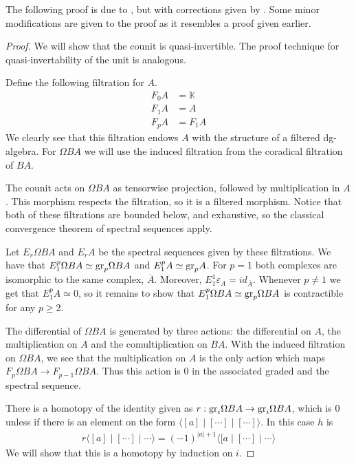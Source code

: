 \documentclass[../thesis.tex]{subfiles}
\begin{document}
            The following proof is due to \cite{LefevreHasegawa03}, but with corrections given by \cite{Keller05}. Some minor modifications are given to the proof as it resembles a proof given earlier.

            \begin{proof}
                We will show that the counit is quasi-invertible. The proof technique for quasi-invertability of the unit is analogous.

                Define the following filtration for $A$.
                \begin{align*}
                    F_0A & = \mathbb{K} \\
                    F_1A & = A \\
                    F_pA & = F_1A 
                \end{align*}
                We clearly see that this filtration endows $A$ with the structure of a filtered dg-algebra. For $\Omega BA$ we will use the induced filtration from the coradical filtration of $BA$.

                The counit acts on $\Omega BA$ as tensorwise projection, followed by multiplication in $A$. This morphism respects the filtration, so it is a filtered morphism. Notice that both of these filtrations are bounded below, and exhaustive, so the classical convergence theorem of spectral sequences apply.

                Let $E_r\Omega BA$ and $E_rA$ be the spectral sequences given by these filtrations. We have that $E_1^{p}\Omega BA \simeq \tt{gr}_p \Omega BA$ and $E_1^{p}A \simeq \tt{gr}_pA$. For $p=1$ both complexes are isomorphic to the same complex, $\overline{A}$. Moreover, $E_1^{1}\varepsilon_A = id_{\overline{A}}$. Whenever $p\neq 1$ we get that $E_1^p A \simeq 0$, so it remains to show that $E_1^p \Omega BA \simeq \tt{gr}_p \Omega BA$ is contractible for any $p \geq 2$.

                The differential of $\Omega BA$ is generated by three actions: the differential on $A$, the multiplication on $A$ and the comultiplication on $BA$. With the induced filtration on $\Omega BA$, we see that the multiplication on $A$ is the only action which maps $F_p\Omega BA \rightarrow F_{p-1}\Omega BA$. Thus this action is $0$ in the associated graded and the spectral sequence. 

                There is a homotopy of the identity given as $r : \tt{gr}_i \Omega BA \rightarrow \tt{gr}_i \Omega BA$, which is $0$ unless if there is an element on the form $\langle [ a ] \mid [ \cdots ] \mid [ \cdots ] \rangle$. In this case $h$ is 
                \begin{align*}                    
                    r\langle [a] \mid [\cdots] \mid \cdots \rangle = (-1)^{|a|+1} \langle [a \mid [\cdots] \mid \cdots \rangle
                \end{align*}
                We will show that this is a homotopy by induction on $i$.


\end{proof}
\end{document}
